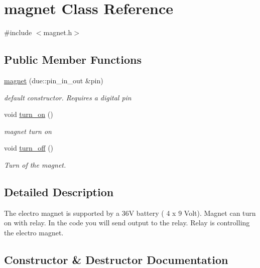 \hypertarget{classmagnet}{}\section{magnet Class Reference}
\label{classmagnet}


{\ttfamily \#include $<$magnet.\+h$>$}

\subsection*{Public Member Functions}
\begin{DoxyCompactItemize}
\item 
\hyperlink{classmagnet_a98aa5fd3f298fec489e30f24902b133f}{magnet} (due\+::pin\+\_\+in\+\_\+out \&pin)
\begin{DoxyCompactList}\small\item\em default constructor. Requires a digital pin \end{DoxyCompactList}\item 
void \hyperlink{classmagnet_a0048a0296469ccb0e9bf1da738c78b0b}{turn\+\_\+on} ()\hypertarget{classmagnet_a0048a0296469ccb0e9bf1da738c78b0b}{}\label{classmagnet_a0048a0296469ccb0e9bf1da738c78b0b}

\begin{DoxyCompactList}\small\item\em magnet turn on \end{DoxyCompactList}\item 
void \hyperlink{classmagnet_ae4d7c7dbe99f1c76a8703470e2f4d3c5}{turn\+\_\+off} ()
\begin{DoxyCompactList}\small\item\em Turn of the magnet. \end{DoxyCompactList}\end{DoxyCompactItemize}


\subsection{Detailed Description}
The electro magnet is supported by a 36V battery ( 4 x 9 Volt). Magnet can turn on with relay. In the code you will send output to the relay. Relay is controlling the electro magnet. 

\subsection{Constructor \& Destructor Documentation}
